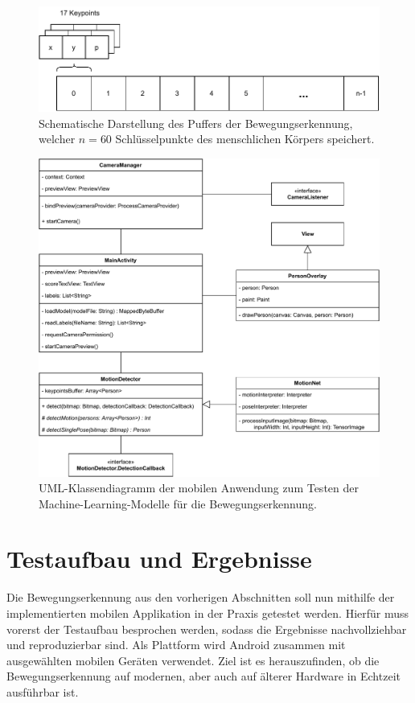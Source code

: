 \begin{figure}
    \includegraphics[width=\textwidth]{images/camera_frame_buffer.pdf}
    \caption{Schematische Darstellung des Puffers der Bewegungserkennung,
    welcher $n = 60$ Schlüsselpunkte des menschlichen Körpers speichert.}
    \label{fig:camera-frame-buffer}
\end{figure}

\begin{figure}
    \includegraphics[width=\textwidth]{images/app_uml.pdf}
    \caption{UML-Klassendiagramm der mobilen Anwendung zum Testen der
    Machine-Learning-Modelle für die Bewegungserkennung.}
    \label{fig:uml-app}
\end{figure}

\section{Testaufbau und Ergebnisse}
Die Bewegungserkennung aus den vorherigen Abschnitten soll nun mithilfe der
implementierten mobilen Applikation in der Praxis getestet werden. Hierfür muss
vorerst der Testaufbau besprochen werden, sodass die Ergebnisse nachvollziehbar
und reproduzierbar sind. Als Plattform wird Android zusammen mit ausgewählten
mobilen Geräten verwendet. Ziel ist es herauszufinden, ob die Bewegungserkennung
auf modernen, aber auch auf älterer Hardware in Echtzeit ausführbar ist.